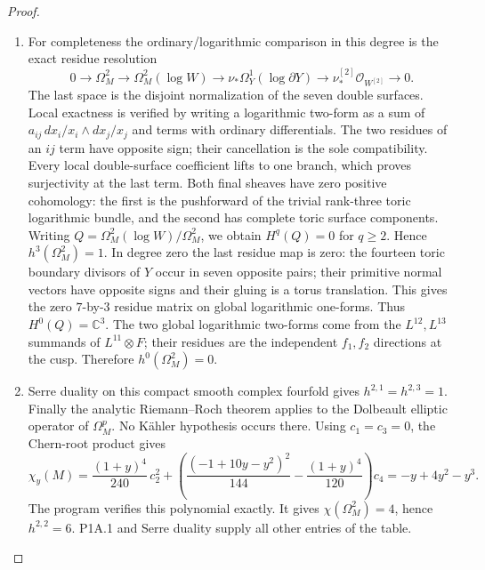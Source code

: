 \begin{proof}
\begin{enumerate}[label=\arabic*.]
\item For completeness the ordinary/logarithmic comparison in this
degree is the exact residue resolution
\[
0\to\Omega_M^2\to\Omega_M^2(\log W)
 \to\nu_*\Omega_Y^1(\log\partial Y)
 \to\nu^{[2]}_*\mathcal O_{W^{[2]}}\to0.
\]
The last space is the disjoint normalization of the seven
double surfaces. Local exactness is verified by writing a
logarithmic two-form as a sum of
$a_{ij}\,dx_i/x_i\wedge dx_j/x_j$ and terms with ordinary
differentials. The two residues of an $ij$ term have opposite
sign; their cancellation is the sole compatibility. Every local
double-surface coefficient lifts to one branch, which proves
surjectivity at the last term.
Both final sheaves have zero positive cohomology: the first
is the pushforward of the trivial rank-three toric logarithmic
bundle, and the second has complete toric surface components.
Writing $Q=\Omega_M^2(\log W)/\Omega_M^2$, we obtain
$H^q(Q)=0$ for $q\ge2$. Hence
$h^3(\Omega_M^2)=1$.
In degree zero the last residue map is zero: the fourteen toric
boundary divisors of $Y$ occur in seven opposite pairs; their
primitive normal vectors have opposite signs and their gluing
is a torus translation. This gives the zero $7$-by-$3$ residue
matrix on global logarithmic one-forms. Thus $H^0(Q)=\mathbb C^3$.
The two global logarithmic two-forms come from the
$L^{12},L^{13}$ summands of $L^{11}\otimes F$; their residues
are the independent $f_1,f_2$ directions at the cusp.
Therefore $h^0(\Omega_M^2)=0$.

\item Serre duality \cite[Theorem 4, p.~22]{Serre1955Duality} on this compact smooth complex fourfold gives
$h^{2,1}=h^{2,3}=1$. Finally the analytic Riemann--Roch theorem
\cite[Theorem 25.3.1, p.~187; \S25.4(a), pp.~188--190]{HirzebruchTopologicalMethods} applies to the Dolbeault elliptic
operator of $\Omega_M^p$. No Kähler hypothesis occurs there.
Using $c_1=c_3=0$, the Chern-root product gives
\[
\chi_y(M)=
\frac{(1+y)^4}{240}\,c_2^2+
\left(\frac{(-1+10y-y^2)^2}{144}
       -\frac{(1+y)^4}{120}\right)c_4
=-y+4y^2-y^3.
\]
The program verifies this polynomial exactly. It gives
$\chi(\Omega_M^2)=4$, hence $h^{2,2}=6$.
P1A.1 and Serre duality supply all other entries of the table.

\end{enumerate}
\end{proof}





